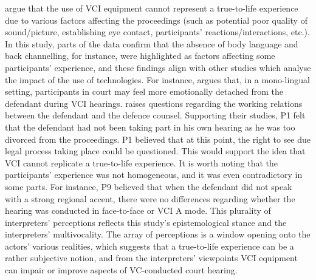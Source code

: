 \documentclass[output=paper]{langsci/langscibook}
\begin{document}
\citet{vanRotterdam2011} argue that the use of \textsc{VCI} equipment cannot represent a true-to-life experience due to various factors affecting the proceedings (such as potential poor quality of sound/picture, establishing eye contact, participants’ reactions/interactions, etc.). In this study, parts of the data confirm that the absence of body language and back channelling, for instance, were highlighted as factors affecting some participants’ experience, and these findings align with other studies which analyse the impact of the use of technologies. For instance, \citet{Radburn-Remfry1994} argues that, in a mono-lingual setting, participants in court may feel more emotionally detached from the defendant during \textsc{VCI} hearings. \citet{Hodges2008} raises questions regarding the working relations between the defendant and the defence counsel. Supporting their studies, P1 felt that the defendant had not been taking part in his own hearing as he was too divorced from the proceedings. P1 believed that at this point, the right to see due legal process taking place could be questioned. This would support the idea that \textsc{VCI} cannot replicate a true-to-life experience. It is worth noting that the participants’ experience was not homogeneous, and it was even contradictory in some parts. For instance, P9 believed that when the defendant did not speak with a strong regional accent, there were no differences regarding whether the hearing was conducted in face-to-face or \textsc{VCI} A mode. This plurality of interpreters’ perceptions reflects this study’s epistemological stance and the interpreters’ multivocality. The array of perceptions is a window opening onto the actors’ various realities, which suggests that a true-to-life experience can be a rather subjective notion, and from the interpreters’ viewpoints \textsc{VCI} equipment can impair or improve aspects of VC-conducted court hearing.
\end{document}
